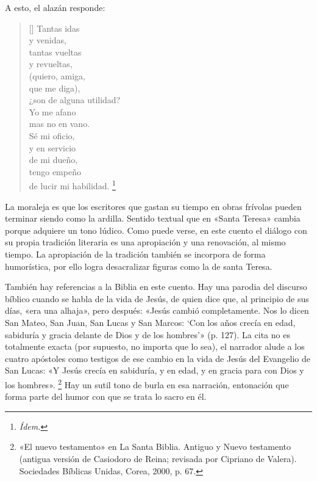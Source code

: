\documentclass[14pt,twoside,final]{extbook} %
\let\oldfootnote\footnote
\renewcommand\footnote[1]{%
\oldfootnote{\hspace{1mm}#1}}
\begin{document}
A esto, el alazán responde:
\settowidth{\versewidth}{¿son de alguna utilidad?}
\begin{verse}[\versewidth]
Tantas idas \\
y venidas, \\
tantas vueltas \\
y revueltas, \\
(quiero, amiga, \\
que me diga), \\
¿son de alguna utilidad? \\
Yo me afano \\
mas no en vano. \\
Sé mi oficio, \\
y en servicio \\
de mi dueño, \\
tengo empeño \\
de lucir mi habilidad.\footnote{\em Ídem.}
\end{verse}
La moraleja es que los escritores que gastan su tiempo en obras frívolas pueden terminar siendo como la ardilla. Sentido textual que en «Santa Teresa» cambia porque adquiere un tono lúdico. Como puede verse, en este cuento el diálogo con su propia tradición literaria es una apropiación y una renovación, al mismo tiempo. La apropiación de la tradición también se incorpora de forma humorística, por ello logra desacralizar figuras como la de santa Teresa.

También hay referencias a la Biblia en este cuento. Hay una parodia del discurso bíblico cuando se habla de la vida de Jesús, de quien dice que, al principio de sus días, «era una alhaja», pero después: «Jesús cambió completamente. Nos lo dicen San Mateo, San Juan, San Lucas y San Marcos: `Con los años crecía en edad, sabiduría y gracia delante de Dios y de los hombres'» (p. 127). La cita no es totalmente exacta (por supuesto, no importa que lo sea), el narrador alude a los cuatro apóstoles como testigos de ese cambio en la vida de Jesús del Evangelio de San Lucas: «Y Jesús crecía en sabiduría, y en edad, y en gracia para con Dios y los hombres».\footnote{«El nuevo testamento» en La Santa Biblia. Antiguo y Nuevo testamento (antigua versión de Casiodoro de Reina; revisada por Cipriano de Valera). Sociedades Bíblicas Unidas, Corea, 2000, p. 67.} Hay un sutil tono de burla en esa narración, entonación que forma parte del humor con que se trata lo sacro en él.\protect\enlargethispage*{\baselineskip}
\end{document}

